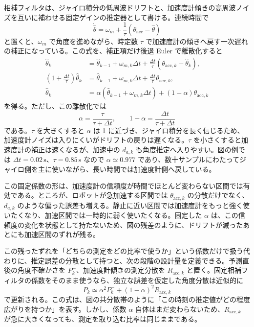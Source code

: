 相補フィルタは、ジャイロ積分の低周波ドリフトと、加速度計傾きの高周波ノイズを互いに補わせる固定ゲインの推定器として書ける。連続時間で
\begin{equation}
  \dot{\hat{\theta}}
  =
  \omega_m+\frac{1}{\tau}
  \left(\theta_{\mathrm{acc}}-\hat{\theta}\right)
\end{equation}
と置くと、$\omega_m$ で角度を進めながら、時定数 $\tau$ で加速度計の傾きへ戻す一次遅れの補正になっている。この式を、補正項だけ後退 Euler で離散化すると
\begin{align}
  \hat{\theta}_k
  &=
  \hat{\theta}_{k-1}+\omega_{m,k}\Delta t
  +\frac{\Delta t}{\tau}
  \left(\theta_{\mathrm{acc},k}-\hat{\theta}_k\right),\\
  \left(1+\frac{\Delta t}{\tau}\right)\hat{\theta}_k
  &=
  \hat{\theta}_{k-1}+\omega_{m,k}\Delta t
  +\frac{\Delta t}{\tau}\theta_{\mathrm{acc},k},\\
  \hat{\theta}_k
  &=
  \alpha
  \left(\hat{\theta}_{k-1}+\omega_{m,k}\Delta t\right)
  +(1-\alpha)\theta_{\mathrm{acc},k}
\end{align}
を得る。ただし、この離散化では
\begin{equation}
  \alpha=\frac{\tau}{\tau+\Delta t},
  \qquad
  1-\alpha=\frac{\Delta t}{\tau+\Delta t}
\end{equation}
である。$\tau$ を大きくすると $\alpha$ は 1 に近づき、ジャイロ積分を長く信じるため、加速度計ノイズは入りにくいがドリフトの戻りは遅くなる。$\tau$ を小さくすると加速度計の補正は速くなるが、加速中の $d_{a,k}$ も角度推定へ入りやすい。図の例では $\Delta t=0.02\,\mathrm{s}$、$\tau=0.85\,\mathrm{s}$ なので $\alpha\simeq0.977$ であり、数十サンプルにわたってジャイロ側を主に使いながら、長い時間では加速度計側へ戻している。

この固定係数の形は、加速度計の信頼度が時間でほとんど変わらない区間では有効である。ところが、ロボットが急加速する区間では $\theta_{\mathrm{acc},k}$ の分散だけでなく、$d_{a,k}$ のような偏った誤差も増える。静止に近い区間では加速度計をもっと強く使いたくなり、加速区間では一時的に弱く使いたくなる。固定した $\alpha$ は、この信頼度の変化を状態として持たないため、図の残差のように、ドリフトが減ったあとにも加速区間のずれが残る。

この残ったずれを「どちらの測定をどの比率で使うか」という係数だけで扱う代わりに、推定誤差の分散として持つと、次の段階の設計量を定義できる。予測直後の角度不確かさを $P^-_k$、加速度計傾きの測定分散を $R_{\mathrm{acc},k}$ と置く。固定相補フィルタの係数をそのまま使うなら、独立な誤差を仮定した角度分散は近似的に
\begin{equation}
  P_k
  \simeq
  \alpha^2 P^-_k+(1-\alpha)^2R_{\mathrm{acc},k}
\end{equation}
で更新される。この式は、図の共分散帯のように「この時刻の推定値がどの程度広がりを持つか」を表す。しかし、係数 $\alpha$ 自体はまだ変わらないため、$R_{\mathrm{acc},k}$ が急に大きくなっても、測定を取り込む比率は同じままである。

